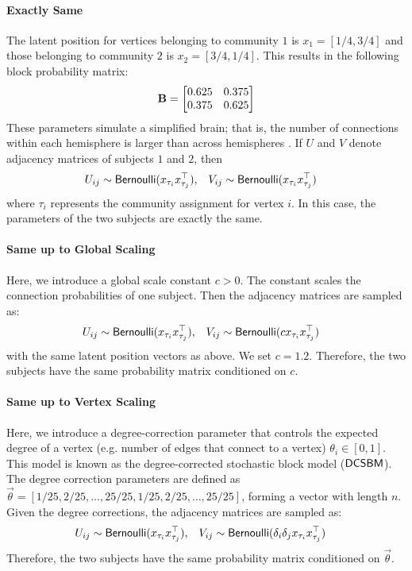 \paragraph{Exactly Same}
 The latent position for vertices belonging to community $1$ is $x_1 = [1/4, 3/4]$ and those belonging to community $2$ is $x_2 = [3/4, 1/4]$. This results in the following block probability matrix:
\begin{align*}
    \operatorname*{\mathbf{B}} = 
    \begin{bmatrix}
        0.625 & 0.375 \\
        0.375 & 0.625
    \end{bmatrix}
\end{align*}
These parameters simulate a simplified brain; that is, the number of connections within each hemisphere is larger than across hemispheres \cite{catani2012atlas}. If $U$ and $V$ denote adjacency matrices of subjects $1$ and $2$, then 
\begin{align*}
    U_{ij} \sim \operatorname{\mathsf{Bernoulli}}(x_{\tau_i} x_{\tau_j}^\top), \quad & V_{ij} \sim \operatorname{\mathsf{Bernoulli}}(x_{\tau_i} x_{\tau_j}^\top)
\end{align*}
where $\tau_i$ represents the community assignment for vertex $i$. In this case, the parameters of the two subjects are exactly the same.

\paragraph{Same up to Global Scaling}
Here, we introduce a global scale constant $c > 0$. The constant scales the connection probabilities of one subject. Then the adjacency matrices are sampled as:
\begin{align*}
    U_{ij} \sim \operatorname{\mathsf{Bernoulli}}(x_{\tau_i} x_{\tau_j}^\top), \quad & V_{ij} \sim \operatorname{\mathsf{Bernoulli}}(cx_{\tau_i} x_{\tau_j}^\top)
\end{align*}
with the same latent position vectors as above. We set $c=1.2$. Therefore, the two subjects have the same probability matrix conditioned on $c$.

\paragraph{Same up to Vertex Scaling}
Here, we introduce a degree-correction parameter that controls the expected degree of a vertex (e.g. number of edges that connect to a vertex) $\theta_i \in[0, 1]$. This model is known as the degree-corrected stochastic block model ($\operatorname{\mathsf{DCSBM}}$). The degree correction parameters are defined as $\vec\theta = [1/25, 2/25, \ldots, 25/25, 1/25, 2/25, \ldots, 25/25]$, forming a vector with length $n$. Given the degree corrections, the adjacency matrices are sampled as:
\begin{align*}
    U_{ij} \sim \operatorname{\mathsf{Bernoulli}}( x_{\tau_i} x_{\tau_j}^\top), \quad & V_{ij} \sim \operatorname{\mathsf{Bernoulli}}(\delta_i\delta_j x_{\tau_i} x_{\tau_j}^\top)
\end{align*}
Therefore, the two subjects have the same probability matrix conditioned on $\vec\theta$. 

